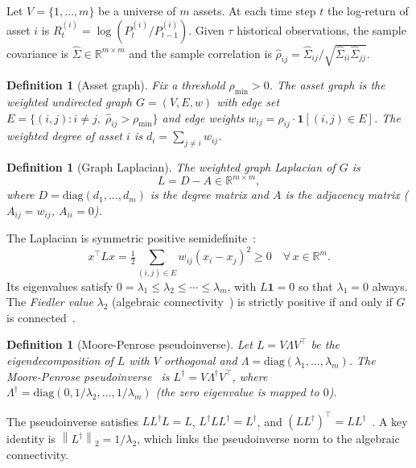 \documentclass[twocolumn,11pt,a4paper]{article}
\newtheorem{definition}[theorem]{Definition}
\theoremstyle{remark}
\newcommand{\R}{\mathbb{R}}
\newcommand{\one}{\mathbf{1}}
\newcommand{\Ld}{L^\dagger}
\newcommand{\lam}[1]{\lambda_{#1}}
\newcommand{\norm}[1]{\left\lVert #1 \right\rVert_2}
\begin{document}
Let $V = \{1,\ldots,m\}$ be a universe of $m$ assets.
At each time step $t$ the log-return of asset $i$ is $R_t^{(i)} = \log(P_t^{(i)}/P_{t-1}^{(i)})$.
Given $\tau$ historical observations, the sample covariance is
$\hat\Sigma \in \R^{m\times m}$ and the sample correlation is
$\hat\rho_{ij} = \hat\Sigma_{ij}/\sqrt{\hat\Sigma_{ii}\hat\Sigma_{jj}}$.

\begin{definition}[Asset graph]
\label{def:graph}
Fix a threshold $\rho_{\min} > 0$. The \emph{asset graph} is the weighted undirected graph
$G=(V,E,w)$ with edge set
$E = \{(i,j) : i\neq j,\; \hat\rho_{ij} > \rho_{\min}\}$
and edge weights $w_{ij} = \hat\rho_{ij}\cdot\mathbf{1}[(i,j)\in E]$.
The weighted degree of asset $i$ is $d_i = \sum_{j \neq i} w_{ij}$.
\end{definition}

\begin{definition}[Graph Laplacian]
\label{def:laplacian}
The \emph{weighted graph Laplacian} of $G$ is
\begin{equation}
  L = D - A \in \R^{m\times m},
\end{equation}
where $D = \mathrm{diag}(d_1,\ldots,d_m)$ is the degree matrix
and $A$ is the adjacency matrix ($A_{ij} = w_{ij}$, $A_{ii}=0$).
\end{definition}

The Laplacian is symmetric positive semidefinite~\cite{chung1997}:
\begin{equation}
  x^\top L x = \tfrac{1}{2}\sum_{(i,j)\in E} w_{ij}(x_i - x_j)^2 \geq 0
  \quad \forall\, x \in \R^m.
\end{equation}
Its eigenvalues satisfy $0 = \lam{1} \leq \lam{2} \leq \cdots \leq \lam{m}$,
with $L\one = 0$ so that $\lam{1} = 0$ always.
The \emph{Fiedler value} $\lam{2}$ (algebraic connectivity~\cite{fiedler1973}) is
strictly positive if and only if $G$ is connected~\cite{mohar1991}.

\begin{definition}[Moore-Penrose pseudoinverse]
\label{def:pseudo}
Let $L = V\Lambda V^\top$ be the eigendecomposition of $L$ with $V$ orthogonal
and $\Lambda = \mathrm{diag}(\lam{1},\ldots,\lam{m})$. The
\emph{Moore-Penrose pseudoinverse}~\cite{penrose1955,golub1996} is
$\Ld = V\Lambda^\dagger V^\top$,
where $\Lambda^\dagger = \mathrm{diag}(0, 1/\lam{2}, \ldots, 1/\lam{m})$
(the zero eigenvalue is mapped to $0$).
\end{definition}

The pseudoinverse satisfies $L\Ld L = L$, $\Ld L\Ld = \Ld$, and
$(L\Ld)^\top = L\Ld$~\cite{penrose1955}.
A key identity is $\norm{\Ld} = 1/\lam{2}$, which links the pseudoinverse norm
to the algebraic connectivity.
\end{document}
